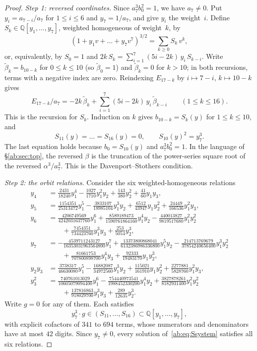 \documentclass[a4paper,11pt]{article}
\theoremstyle{plain}
\theoremstyle{definition}
\theoremstyle{remark}
\begin{document}
\begin{proof}
\emph{Step 1: reversed coordinates.} Since $a_7^3b_0^2=1$, we have $a_7\neq0$. Put $y_i=a_{7-i}/a_7$ for $1\le i\le 6$ and $y_7=1/a_7$, and give $y_i$ the weight~$i$. Define $S_k\in\mathbb{Q}[y_1,\dots,y_7]$, weighted homogeneous of weight~$k$, by
\[
(1+y_1v+\dots+y_7v^7)^{3/2}=\sum_{k\ge0}S_k\,v^k ,
\]
or, equivalently, by $S_0=1$ and $2k\,S_k=\sum_{i=1}^{7}(5i-2k)\,y_i\,S_{k-i}$. Write $\tilde\beta_k=b_{10-k}$ for $0\le k\le 10$ (so $\tilde\beta_0=1$) and $\tilde\beta_k=0$ for $k>10$; in both recursions, terms with a negative index are zero. Reindexing $E_{17-k}$ by $i\mapsto 7-i$, $k\mapsto 10-k$ gives
\[
E_{17-k}/a_7=-2k\,\tilde\beta_k+\sum_{i=1}^{7}(5i-2k)\,y_i\,\tilde\beta_{k-i}\qquad(1\le k\le 16).
\]
This is the recursion for $S_k$. Induction on $k$ gives $b_{10-k}=S_k(y)$ for $1\le k\le 10$, and
\begin{equation}\label{ab:eq:Ssystem}
S_{11}(y)=\dots=S_{16}(y)=0,\qquad S_{10}(y)^2=y_7^3 .
\end{equation}
The last equation holds because $b_0=S_{10}(y)$ and $a_7^3b_0^2=1$. In the language of \S\ref{ab:sec:top}, the reversed $\beta$ is the truncation of the power-series square root of the reversed $\alpha^3/a_7^3$. This is the Davenport--Stothers condition.

\emph{Step 2: the orbit relations.} Consider the six weighted-homogeneous relations
\begin{align*}
y_4&=\tfrac{2431}{18240}y_1^4-\tfrac{1027}{1710}y_1^2y_2+\tfrac{143}{380}y_2^2+\tfrac{41}{60}y_1y_3,\\
y_5&=\tfrac{1154351}{25313472}y_1^5-\tfrac{3833107}{18985104}y_1^3y_2+\tfrac{6512}{43947}y_1y_2^2+\tfrac{24449}{166536}y_1^2y_3,\\
y_6&=\tfrac{4206749569}{4242031637760}y_1^6+\tfrac{8589189473}{1590761864160}y_1^4y_2-\tfrac{440013827}{9819517680}y_1^2y_2^2\\&\qquad+\tfrac{7454351}{734423760}y_1^3y_3+\tfrac{253}{5054}y_2^3,\\
y_7&=-\tfrac{4539711243127}{16353031963564800}y_1^7+\tfrac{13373800868041}{6132386986336800}y_1^5y_2-\tfrac{214713769679}{37854240656400}y_1^3y_2^2\\&\qquad+\tfrac{81661753}{707800898700}y_1^4y_3+\tfrac{92333}{19483170}y_1y_2^3,\\
y_2y_3&=\tfrac{3738317}{46630080}y_1^5-\tfrac{16882087}{34972560}y_1^3y_2+\tfrac{115021}{161910}y_1y_2^2+\tfrac{2277881}{5828760}y_1^2y_3,\\
y_3^2&=\tfrac{740761013029}{10605079094400}y_1^6-\tfrac{754440973541}{1988452330200}y_1^4y_2+\tfrac{3827878261}{8182931400}y_1^2y_2^2\\&\qquad+\tfrac{137816863}{918029700}y_1^3y_3+\tfrac{289}{12635}y_2^3 .
\end{align*}
Write $g=0$ for any of them. Each satisfies
\[
y_7^3\cdot g\in(S_{11},\dots,S_{16})\subset\mathbb{Q}[y_1,\dots,y_7],
\]
with explicit cofactors of $341$ to $694$ terms, whose numerators and denominators have at most $42$ digits. Since $y_7\neq0$, every solution of~\eqref{ab:eq:Ssystem} satisfies all six relations.


\end{proof}
\end{document}
